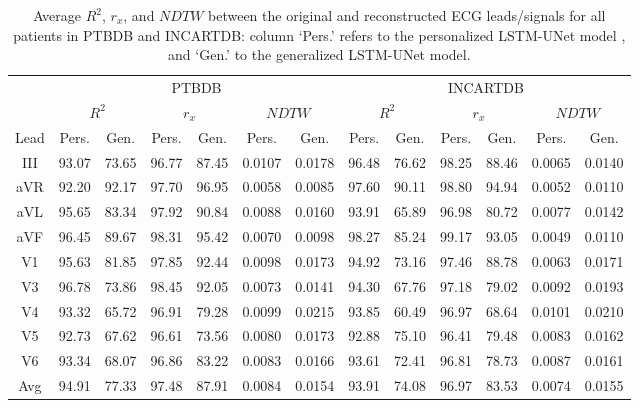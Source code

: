 

\begin{table}
\begin{center}
\begin{small}
\renewcommand{\arraystretch}{1.1}
\renewcommand{\tabcolsep}{9pt}

\caption{Average $R^2$, $r_x$, and $NDTW$ between the original and reconstructed ECG leads/signals for all patients in PTBDB and INCARTDB: column `Pers.' refers to the personalized LSTM-UNet model \cite{lstm-unet}, and `Gen.' to the generalized LSTM-UNet model.}

\begin{tabular}{|c|cc|cc|cc|cc|cc|cc|}
\hline
\cline{2-13}
& \multicolumn{6}{c|}{PTBDB}
& \multicolumn{6}{c|}{INCARTDB} \\

\cline{2-13}
& \multicolumn{2}{c|}{$R^2$}
& \multicolumn{2}{c|}{$r_x$} & \multicolumn{2}{c|}{$NDTW$} & \multicolumn{2}{c|}{$R^2$}
& \multicolumn{2}{c|}{$r_x$} & \multicolumn{2}{c|}{$NDTW$}\\

\cline{2-13}
Lead & Pers. & Gen. & Pers. & Gen. & Pers. & Gen.& Pers. & Gen. & Pers. & Gen. & Pers. & Gen. \\
\hline
III  & 93.07 & 73.65 &  96.77 & 87.45 & 0.0107 & 0.0178 & 96.48 & 76.62 & 98.25  & 88.46 & 0.0065 & 0.0140\\
aVR  & 92.20 & 92.17 &  97.70 & 96.95 & 0.0058 & 0.0085 & 97.60 & 90.11 & 98.80  & 94.94 & 0.0052 & 0.0110\\
aVL & 95.65 & 83.34 & 97.92  & 90.84 & 0.0088 & 0.0160 & 93.91 & 65.89 & 96.98  & 80.72 & 0.0077 & 0.0142\\
aVF & 96.45 & 89.67 &  98.31 &95.42  & 0.0070 & 0.0098 & 98.27 & 85.24 & 99.17  & 93.05 & 0.0049 & 0.0110\\
V1 & 95.63  & 81.85 &  97.85 &92.44  & 0.0098 & 0.0173 & 94.92  & 73.16 & 97.46 & 88.78 & 0.0063 & 0.0171\\
V3 & 96.78  & 73.86 &  98.45 &92.05  & 0.0073 & 0.0141 &  94.30 & 67.76 & 97.18 & 79.02 & 0.0092 & 0.0193\\
V4 & 93.32  & 65.72 &  96.91 &79.28 & 0.0099 & 0.0215 & 93.85  & 60.49 & 96.97 & 68.64 & 0.0101 & 0.0210\\
V5 & 92.73 & 67.62 & 96.61 &  73.56 & 0.0080 & 0.0173 & 92.88  & 75.10 & 96.41  & 79.48 & 0.0083 & 0.0162 \\
V6 & 93.34  & 68.07 &  96.86 & 83.22  & 0.0083 & 0.0166 & 93.61  & 72.41 & 96.81 & 78.73 & 0.0087 & 0.0161\\
\hline
Avg & 94.91 & 77.33 & 97.48 & 87.91 & 0.0084 & 0.0154 & 93.91 & 74.08 & 96.97 & 83.53 & 0.0074 & 0.0155 \\


\hline
\end{tabular}
\label{ptbdb_incart_pg}
\end{small}

\end{center}
\end{table}